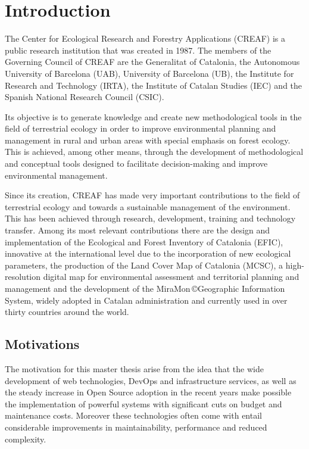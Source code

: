 \chapter{Introduction}

The Center for Ecological Research and Forestry Applications (CREAF) is a public research institution that was created in 1987.  The members of the Governing Council of CREAF are the Generalitat of Catalonia, the Autonomous University of Barcelona (UAB), University of Barcelona (UB), the Institute for Research and Technology (IRTA), the Institute of Catalan Studies (IEC) and the Spanish National Research Council (CSIC).

Its objective is to generate knowledge and create new methodological tools in the field of terrestrial ecology in order to improve environmental planning and management in rural and urban areas with special emphasis on forest ecology. This is achieved, among other means, through the development of methodological and conceptual tools designed to facilitate decision-making and improve environmental management.

Since its creation, CREAF has made very important contributions to the field of terrestrial ecology and towards a sustainable management of the environment. This has been achieved through research, development, training and technology transfer. Among its most relevant contributions there are the design and implementation of the Ecological and Forest Inventory of Catalonia (EFIC), innovative at the international level due to the incorporation of new ecological parameters, the production of the Land Cover Map of Catalonia (MCSC), a high-resolution digital map for environmental assessment and territorial planning and management and the development of the MiraMon \copyright  Geographic Information System, widely adopted in Catalan administration and currently used in over thirty countries around the world.


\section{Motivations}

The motivation for this master thesis arise from the idea that the wide development of web technologies, DevOps and infrastructure services, as well as the steady increase in Open Source adoption in the recent years make possible the implementation of powerful systems with significant cuts on budget and maintenance costs. Moreover these technologies often come with entail considerable improvements in maintainability, performance and reduced complexity.

